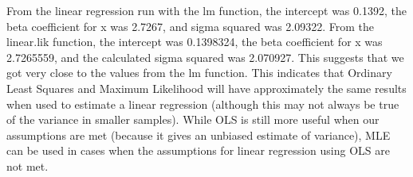 \documentclass[12pt,letterpaper]{article}
\begin{document}
\noindent From the linear regression run with the lm function, the intercept was 0.1392, the beta coefficient for x was 2.7267, and sigma squared was 2.09322. From the linear.lik function, the intercept was 0.1398324, the beta coefficient for x was 2.7265559, and the calculated sigma squared was 2.070927. This suggests that we got very close to the values from the lm function. This indicates that Ordinary Least Squares and Maximum Likelihood will have approximately the same results when used to estimate a linear regression (although this may not always be true of the variance in smaller samples). While OLS is still more useful when our assumptions are met (because it gives an unbiased estimate of variance), MLE can be used in cases when the assumptions for linear regression using OLS are not met.
\end{document}
